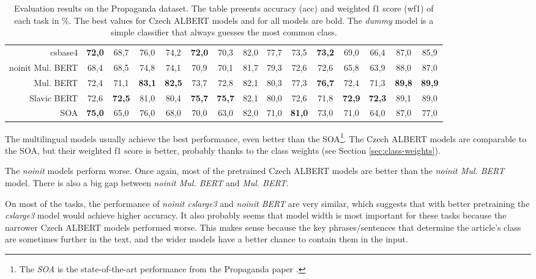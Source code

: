 \documentclass[
  printed, %
  color,   %
  table,   %
  oneside, %
  lof,     %
  lot,     %
]{fithesis3}
\begin{document}
\begin{table}[hbt]
\begin{adjustbox}{center}
\begin{tabular}{r|c|c|c|c|c|c|c|c|c|c|c|c|c|c}
        csbase4 & \textbf{72,0} & 68,7 & 76,0 & 74,2 & \textbf{72,0} & 70,3 & 82,0 & 77,7 & 73,5 & \textbf{73,2} & 69,0 & 66,4 & 87,0 & 85,9 \\
        
        noinit Mul. BERT & 68,4 & 68,5 & 74,8 & 74,1 & 70,9 & 70,1 & 81,7 & 79,3 & 72,6 & 72,6 & 65,8 & 63,9 & 88,0 & 87,0  \\
        
        Mul. BERT & 72,4 & 71,1 & \textbf{83,1} & \textbf{82,5} & 73,7 & 72,8 & 82,1 & 80,3 & 77,3 & \textbf{76,7} & 72,4 & 71,3 & \textbf{89,8} & \textbf{89,9} \\
    
        Slavic BERT & 72,6 & \textbf{72,5} & 81,0 & 80,4 & \textbf{75,7} & \textbf{75,7} & 82,1 & 80,0 & 72,6 & 71,8 & \textbf{72,9} & \textbf{72,3} & 89,1 & 89,0 \\

        SOA & \textbf{75,0} & 65,0 & 76,0 & 68,0 & 70,0 & 63,0 & 82,0 & 71,0 & \textbf{81,0} & 73,0 & 71,0 & 64,0 & 87,0 & 77,0 \\


\end{tabular}
\end{adjustbox}
\caption[Evaluation results on Propaganda]
{Evaluation results on the Propaganda dataset. The table presents accuracy (acc) and weighted f1 score (wf1) of each task in \%. The best values for Czech ALBERT models and for all models are bold. The \textit{dummy} model is a simple classifier that always guesses the most common class.}
\label{tab:prop-results}
\end{table} %

The multilingual models usually achieve the best performance, even better than the SOA\footnote{The \textit{SOA} is the state-of-the-art performance from the Propaganda paper \parencite{propaganda}.}. The Czech ALBERT models are comparable to the SOA, but their weighted f1 score is better, probably thanks to the class weights (see Section \ref{sec:class-weights}).

The \textit{noinit} models perform worse. Once again, most of the pretrained Czech ALBERT models are better than the \textit{noinit Mul. BERT} model. There is also a big gap between \textit{noinit Mul. BERT} and \textit{Mul. BERT}.

On most of the tasks, the performance of \textit{noinit cslarge3} and \textit{noinit BERT} are very similar, which suggests that with better pretraining the \textit{cslarge3} model would achieve higher accuracy. It also probably seems that model width is most important for these tasks because the narrower Czech ALBERT models performed worse. This makes sense because the key phrases/sentences that determine the article's class are sometimes further in the text, and the wider models have a better chance to contain them in the input.
\end{document}
